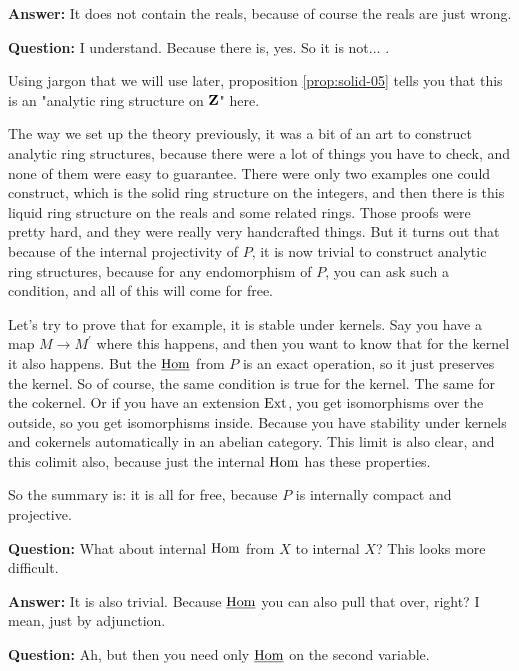 \textbf{Answer:} It does not contain the reals, because of course the reals are just wrong. 

\textbf{Question:} I understand. Because there is, yes. So it is not... .


Using jargon that we will use later, proposition \ref{prop:solid-05} tells you that this is an "analytic ring structure on $\mathbf Z$" here.

The way we set up the theory previously, it was a bit of an art to construct analytic ring structures, because there were a lot of things you have to check, and none of them were easy to guarantee. 
There were only two examples one could construct, which is the solid ring structure on the integers, and then there is this liquid ring structure on the reals and some related rings. 
Those proofs were pretty hard, and they were really very handcrafted things. 
But it turns out that because of the internal projectivity of $P$, it is now trivial to construct analytic ring structures, because for any endomorphism of $P$, you can ask such a condition, and all of this will come for free.

\begin{sketch}

Let's try to prove that for example, it is stable under kernels. Say you have a map $M \to M^{'}$ where this happens, and then you want to know that for the kernel it also happens. But the $\operatorname{\underline{Hom}}$ from $P$ is an exact operation, so it just preserves the kernel. So of course, the same condition is true for the kernel. 
The same for the cokernel. Or if you have an extension $\operatorname{Ext}$,  you get isomorphisms over the outside, so you get isomorphisms inside. 
Because you have stability under kernels and cokernels automatically in an abelian category. 
This limit is also clear, and this colimit also, because just the internal $\operatorname{Hom}$ has these properties. 


So the summary is: it is all for free, because $P$ is internally compact and projective.
\end{sketch}

\textbf{Question:} What about internal $\operatorname{Hom}$ from $X$ to internal $X$? This looks more difficult. 

\textbf{Answer:} It is also trivial. Because $\operatorname{\underline{Hom}}$ you can also pull that over, right? I mean, just by adjunction.

\textbf{Question:} Ah, but then you need only $\operatorname{\underline{Hom}}$ on the second variable. 

